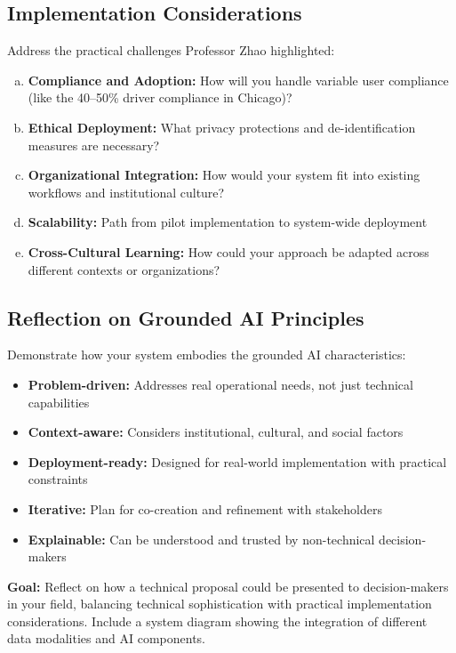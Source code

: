\documentclass[11pt]{article}
\begin{document}
\subsection*{Implementation Considerations}
Address the practical challenges Professor Zhao highlighted:

\begin{enumerate}[(a)]
\item \textbf{Compliance and Adoption:} How will you handle variable user compliance (like the 40--50\% driver compliance in Chicago)?
\item \textbf{Ethical Deployment:} What privacy protections and de-identification measures are necessary?
\item \textbf{Organizational Integration:} How would your system fit into existing workflows and institutional culture?
\item \textbf{Scalability:} Path from pilot implementation to system-wide deployment
\item \textbf{Cross-Cultural Learning:} How could your approach be adapted across different contexts or organizations?
\end{enumerate}

\subsection*{Reflection on Grounded AI Principles}
Demonstrate how your system embodies the grounded AI characteristics:
\begin{itemize}
\item \textbf{Problem-driven:} Addresses real operational needs, not just technical capabilities
\item \textbf{Context-aware:} Considers institutional, cultural, and social factors
\item \textbf{Deployment-ready:} Designed for real-world implementation with practical constraints
\item \textbf{Iterative:} Plan for co-creation and refinement with stakeholders
\item \textbf{Explainable:} Can be understood and trusted by non-technical decision-makers
\end{itemize}

\noindent\textbf{Goal:} Reflect on how a technical proposal could be presented to decision-makers in your field, balancing technical sophistication with practical implementation considerations. Include a system diagram showing the integration of different data modalities and AI components.
\end{document}
